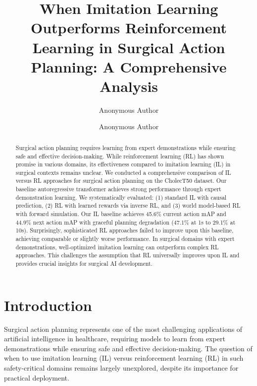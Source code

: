 \documentclass[runningheads]{llncs}
\begin{document}
\title{When Imitation Learning Outperforms Reinforcement Learning in Surgical Action Planning: A Comprehensive Analysis}

\author{Anonymous Author \and Anonymous Author}

\maketitle

\begin{abstract}
Surgical action planning requires learning from expert demonstrations while ensuring safe and effective decision-making. While reinforcement learning (RL) has shown promise in various domains, its effectiveness compared to imitation learning (IL) in surgical contexts remains unclear. We conducted a comprehensive comparison of IL versus RL approaches for surgical action planning on the CholecT50 dataset. Our baseline autoregressive transformer achieves strong performance through expert demonstration learning. We systematically evaluated: (1) standard IL with causal prediction, (2) RL with learned rewards via inverse RL, and (3) world model-based RL with forward simulation. Our IL baseline achieves 45.6\% current action mAP and 44.9\% next action mAP with graceful planning degradation (47.1\% at 1s to 29.1\% at 10s). Surprisingly, sophisticated RL approaches failed to improve upon this baseline, achieving comparable or slightly worse performance. In surgical domains with expert demonstrations, well-optimized imitation learning can outperform complex RL approaches. This challenges the assumption that RL universally improves upon IL and provides crucial insights for surgical AI development.

\end{abstract}

\section{Introduction}

Surgical action planning represents one of the most challenging applications of artificial intelligence in healthcare, requiring models to learn from expert demonstrations while ensuring safe and effective decision-making. The question of when to use imitation learning (IL) versus reinforcement learning (RL) in such safety-critical domains remains largely unexplored, despite its importance for practical deployment.
\end{document}
